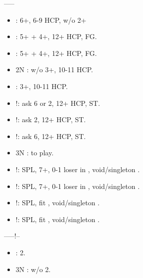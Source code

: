 \documentclass[12pt,twoside,a5paper]{report}%
\begin{document}

	------
	\begin{itemize}
	\renewcommand{\labelitemi}{}
	\item {} : 6+\di{}, 6-9 HCP, w/o 2+\cl{}
	\item {} : 5+\di{} + 4+\he{}, 12+ HCP, FG.
	\item {} : 5+\di{} + 4+\sp{}, 12+ HCP, FG.
	\item 2N : w/o 3+\cl{}, 10-11 HCP.
	\item {} : 3+\cl{}, 10-11 HCP.
	\item {}!: ask 6\cl{} or 2\di{}, 12+ HCP, ST.
	\item {}!: ask 2\di{}, 12+ HCP, ST.
	\item {}!: ask 6\cl{}, 12+ HCP, ST.
	\item 3N : to play.
	\item {}!: SPL, 7+\di{}, 0-1 loser in \di{}, void/singleton \he{}.
	\item {}!: SPL, 7+\di{}, 0-1 loser in \di{}, void/singleton \sp{}.
	\item {}!: SPL, fit \cl{}, void/singleton \he{}.
	\item {}!: SPL, fit \cl{}, void/singleton \sp{}.	
	\end{itemize}

	------!--
	\begin{itemize}
	\renewcommand{\labelitemi}{}
	\item {} : 2\di{}.
	\item 3N : w/o 2\di{}.
	\end{itemize}
\end{document}
